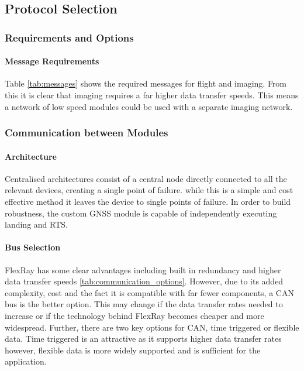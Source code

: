 \subsection{Protocol Selection}

\subsubsection{Requirements and Options}
\paragraph{Message Requirements}
Table \ref{tab:messages} shows the required messages for flight and imaging. From this it is clear that imaging requires a far higher data transfer speeds. This means a network of low speed modules could be used with a separate imaging network.



\subsubsection{Communication between Modules}
\paragraph{Architecture}
Centralised architectures consist of a central node directly connected to all the relevant devices, creating a single point of failure. while this is a simple and cost effective method it leaves the device to single points of failure. In order to build robustness, the custom \gls{GNSS} module is capable of independently executing landing and \gls{RTS}.  
\paragraph{Bus Selection}
FlexRay has some clear advantages including built in redundancy and higher data transfer speeds \ref{tab:communication_options}. However, due to its added complexity, cost and the fact it is compatible with far fewer components, a \gls{CAN} bus is the better option. This may change if the data transfer rates needed to increase or if the technology behind FlexRay becomes cheaper and more widespread. Further, there are two key options for \gls{CAN}, time triggered or flexible data. Time triggered is an attractive as it supports higher data transfer rates however, flexible data is more widely supported and is sufficient for the application.\cite{CANFlexRay}
 

